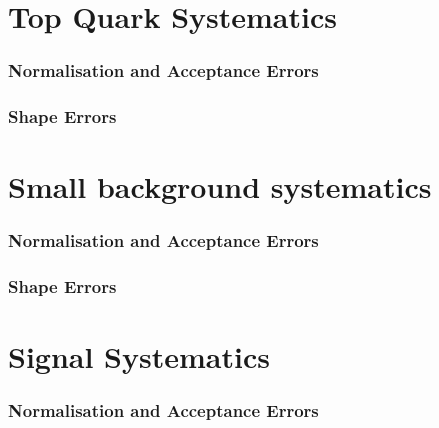 
\section{Top Quark Systematics}


\subsubsection{Normalisation and Acceptance Errors}

\subsubsection{Shape Errors}

\section{Small background systematics}


\subsubsection{Normalisation and Acceptance Errors}

\subsubsection{Shape Errors}

\section{Signal Systematics}


\subsubsection{Normalisation and Acceptance Errors}


